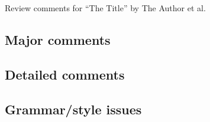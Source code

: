 \documentclass[12pt]{article}
\begin{document}
Review comments for ``The Title'' by The Author et al.

\subsection*{Major comments}


\subsection*{Detailed comments}

\begin{itemize}
\end{itemize}

\subsection*{Grammar/style issues}

\begin{itemize}
\end{itemize}


\end{document}
